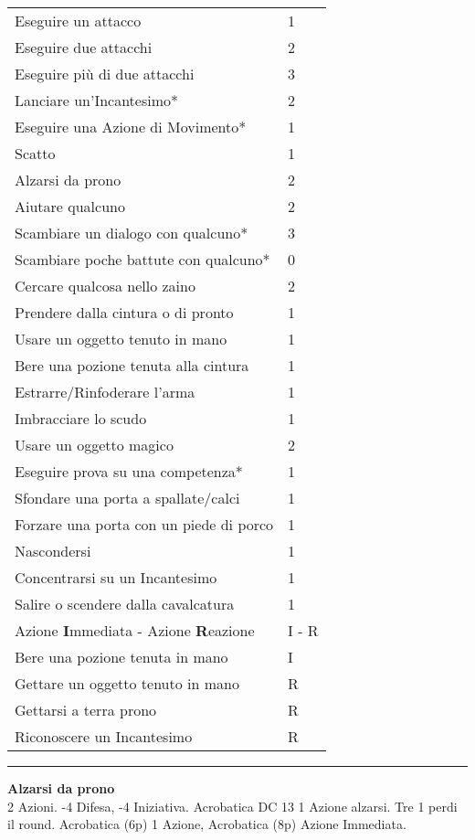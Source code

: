 \documentclass[a4paper,12 pt,openany]{book}
\newcommand{\riga}{\rule{\textwidth}{0.4pt}}
\begin{document}
\begin{textblock*}{8.3cm}
\begin{tabular}{ll}
Eseguire un attacco				& 1\\
Eseguire due attacchi				& 2\\
Eseguire più di due attacchi			& 3\\
Lanciare un'Incantesimo*			& 2\\
Eseguire una Azione di  Movimento*		& 1\\
Scatto						& 1\\
Alzarsi da prono				& 2\\
Aiutare qualcuno				& 2\\
Scambiare un dialogo con qualcuno*		& 3\\
\small{Scambiare poche battute con qualcuno*}	& 0\\
Cercare qualcosa nello zaino			& 2\\
{\small Prendere dalla cintura o di pronto} & 1\\
Usare un oggetto tenuto in mano			& 1\\
Bere una pozione tenuta alla cintura		& 1\\
Estrarre/Rinfoderare l'arma					& 1\\
Imbracciare lo scudo				& 1\\
Usare un oggetto magico				& 2\\
Eseguire prova su una competenza*		& 1\\
Sfondare una porta a spallate/calci			&1\\
Forzare una porta con un piede di porco		&1\\
Nascondersi					& 1\\
Concentrarsi su un Incantesimo			& 1\\
Salire o scendere dalla cavalcatura		& 1\\
Azione \textbf{I}mmediata - Azione \textbf{R}eazione		& I - R\\
Bere una pozione tenuta in mano			& I\\
Gettare un oggetto tenuto in mano		& R\\
Gettarsi a terra prono				& R\\
Riconoscere un Incantesimo			& R\\
\end{tabular}

\riga

\textbf{Alzarsi da prono}\\
2 Azioni. -4 Difesa, -4 Iniziativa. Acrobatica DC 13 1 Azione alzarsi. Tre 1 perdi il round. Acrobatica (6p) 1 Azione, Acrobatica (8p) Azione Immediata.


\end{textblock*}
\end{document}
